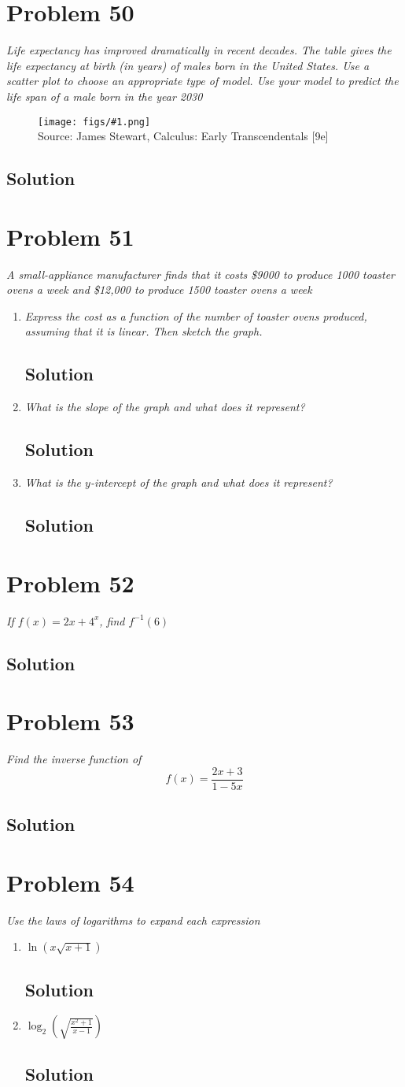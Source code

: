 \documentclass[11pt]{article}
\newcommand{\soln}{\subsection*}
\newcommand{\qn}{\textit}
\newcommand{\imagesource}[1]{{\footnotesize Source: #1}}
\newcommand{\imgqn}[1]{
	\begin{figure}[H]
		\centering
		\texttt{[image: figs/\#1.png]}\\
		\imagesource{James Stewart, Calculus: Early Transcendentals [9e]}
	\end{figure}
}
\begin{document}
\section*{Problem 50}

\qn{Life expectancy has improved dramatically in recent decades. The table gives the life expectancy at birth (in years) of males born in the United States. Use a scatter plot to choose an appropriate type of model. Use your model to predict the life span of a male born in the year 2030}
\imgqn{review-50}
\soln{Solution}

\section*{Problem 51}

\qn{A small-appliance manufacturer finds that it costs \$9000 to produce 1000 toaster ovens a week and \$12,000 to produce 1500 toaster ovens a week}
\begin{enumerate}
	\item \qn{Express the cost as a function of the number of toaster ovens produced, assuming that it is linear. Then sketch the graph.}
	\soln{Solution}
	
	\item \qn{What is the slope of the graph and what does it represent?}
	\soln{Solution}
	
	\item \qn{What is the $y$-intercept of the graph and what does it represent?}
	\soln{Solution}
\end{enumerate}

\section*{Problem 52}

\qn{If $f(x)=2x+4^x$, find $f^{-1}(6)$}
\soln{Solution}

\section*{Problem 53}

\qn{Find the inverse function of $$f(x)=\frac{2x+3}{1-5x}$$}
\soln{Solution}

\section*{Problem 54}

\qn{Use the laws of logarithms to expand each expression}
\begin{enumerate}
	\item \qn{$\ln(x\sqrt{x+1})$}
	\soln{Solution}
	
	\item \qn{$\log_2(\sqrt{\frac{x^2+1}{x-1}})$}
	\soln{Solution}
\end{enumerate}
\end{document}
